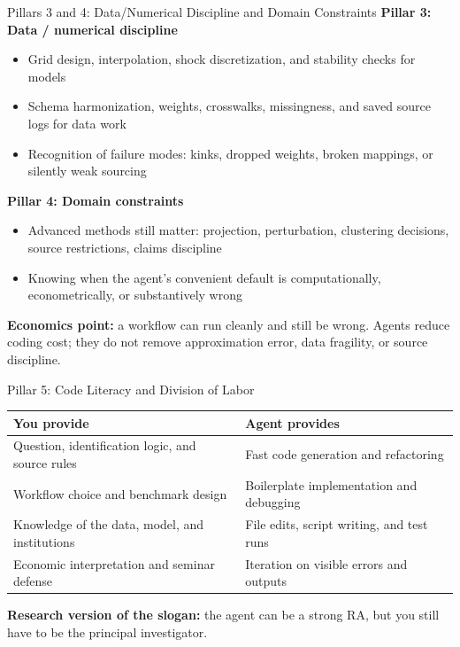 \documentclass[10pt,english,aspectratio=169]{beamer}
\begin{document}
\begin{frame}{Pillars 3 and 4: Data/Numerical Discipline and Domain Constraints}
\textbf{Pillar 3: Data / numerical discipline}
\begin{itemize}
    \item Grid design, interpolation, shock discretization, and stability checks for models
    \item Schema harmonization, weights, crosswalks, missingness, and saved source logs for data work
    \item Recognition of failure modes: kinks, dropped weights, broken mappings, or silently weak sourcing
\end{itemize}

\vspace{0.2cm}

\textbf{Pillar 4: Domain constraints}
\begin{itemize}
    \item Advanced methods still matter: projection, perturbation, clustering decisions, source restrictions, claims discipline
    \item Knowing when the agent's convenient default is computationally, econometrically, or substantively wrong
\end{itemize}

\vspace{0.25cm}

\textbf{Economics point:} a workflow can run cleanly and still be wrong. Agents reduce coding cost; they do not remove approximation error, data fragility, or source discipline.
\end{frame}

\begin{frame}{Pillar 5: Code Literacy and Division of Labor}
\begin{center}
\small
\begin{tabular}{|p{5.5cm}|p{5.9cm}|}
\hline
\textbf{You provide} & \textbf{Agent provides} \\ \hline
Question, identification logic, and source rules & Fast code generation and refactoring \\ \hline
Workflow choice and benchmark design & Boilerplate implementation and debugging \\ \hline
Knowledge of the data, model, and institutions & File edits, script writing, and test runs \\ \hline
Economic interpretation and seminar defense & Iteration on visible errors and outputs \\ \hline
\end{tabular}
\end{center}

\vspace{0.25cm}

\textbf{Research version of the slogan:} the agent can be a strong RA, but you still have to be the principal investigator.
\end{frame}
\end{document}
